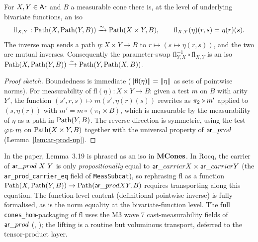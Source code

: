 \begin{lemma}\label{lem:path-flatten}
  \rocqok
  For $X, Y \in \mathsf{Ar}$ and $B$ a measurable cone there is, at the level
  of underlying bivariate functions, an iso
  \[
    \mathrm{fl}_{X, Y} : \mathrm{Path}(X, \mathrm{Path}(Y, B))
    \xrightarrow{\sim}
    \mathrm{Path}(X \times Y, B),
    \qquad
    \mathrm{fl}_{X, Y}(\eta)(r, s) = \eta(r)(s).
  \]
  The inverse map sends a path $\eta : X \times Y \to B$ to
  $r \mapsto (s \mapsto \eta(r, s))$, and the two are mutual
  inverses. Consequently the parameter-swap
  $\mathrm{fl}_{Y, X}^{-1} \circ \mathrm{fl}_{X, Y}$ is an iso
  $\mathrm{Path}(X, \mathrm{Path}(Y, B)) \xrightarrow{\sim} \mathrm{Path}(Y, \mathrm{Path}(X, B))$.
\end{lemma}
\begin{proof}[Proof sketch]
  Boundedness is immediate ($\lVert \mathrm{fl}(\eta) \rVert = \lVert \eta \rVert$
  as sets of pointwise norms). For measurability of
  $\mathrm{fl}(\eta) : X \times Y \to B$: given a test $m$ on $B$
  with arity $Y'$, the function
  $(s', r, s) \mapsto m(s', \eta(r)(s))$ rewrites as
  $\pi_2 \mathbin{\triangleright} m'$ applied to $(s, \eta(r))$ with
  $m' = m \circ (\pi_1 \times B)$, which is measurable by the
  measurability of $\eta$ as a path in $\mathrm{Path}(Y, B)$. The reverse
  direction is symmetric, using the test $\varphi \mathbin{\triangleright} m$ on
  $\mathrm{Path}(X \times Y, B)$ together with the universal property of
  $\mathsf{ar}\_prod$ (Lemma~\ref{lem:ar-prod-up}).
\end{proof}

\begin{remark}
  In the paper, Lemma~3.19 is phrased as an iso in $\mathbf{MCones}$. In
  Rocq, the carrier of $\mathsf{ar}\_prod\ X\ Y$ is only \emph{propositionally}
  equal to $\mathsf{ar}\_carrier X \times \mathsf{ar}\_carrier Y$ (the
  \texttt{ar\_prod\_carrier\_eq} field of \texttt{MeasSubcat}), so
  rephrasing $\mathrm{fl}$ as a function
  $\mathrm{Path}(X, \mathrm{Path}(Y, B)) \to \mathrm{Path}(\mathsf{ar}\_prod X Y, B)$ requires
  transporting along this equation. The function-level content
  (definitional pointwise inverse) is fully formalised, as is the
  norm equality at the bivariate-function level. The full
  \texttt{cones\_hom}-packaging of $\mathrm{fl}$ uses the M3 wave 7
  cast-measurability fields of $\mathsf{ar}\_prod$
  (,
  ); the lifting is a
  routine but voluminous transport, deferred to the tensor-product
  layer.\notready
\end{remark}

